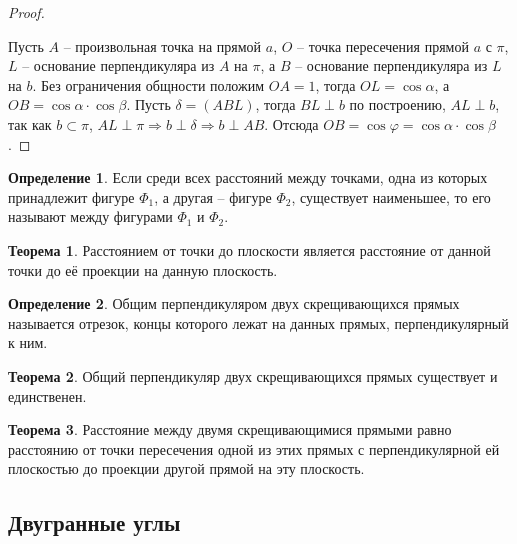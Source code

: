 \documentclass[12pt]{article}
\theoremstyle{definition}
\newtheorem{theorem}{Теорема}[section]
\newtheorem{definition}{Определение}
\begin{document}
\begin{proof}
\begin{center}
            \end{center}
            Пусть $A$ – произвольная точка на прямой $a$, $O$ – точка пересечения прямой $a$ с $\pi$, $L$ – основание перпендикуляра из $A$ на $\pi$, а $B$ – основание перпендикуляра из $L$ на $b$. Без ограничения общности положим $OA=1$, тогда $OL=\cos\alpha$, а $OB=\cos\alpha\cdot\cos\beta$. Пусть $\delta=(ABL)$, тогда $BL\perp b$ по построению, $AL\perp b$, так как $b\subset\pi$, $AL\perp\pi\Longrightarrow b\perp\delta\Longrightarrow b\perp AB$. Отсюда $OB=\cos\varphi=\cos\alpha\cdot\cos\beta$.
    \end{proof}
    \begin{definition}
        Если среди всех расстояний между точками, одна из которых принадлежит фигуре $\Phi_1$, а другая – фигуре $\Phi_2$, существует наименьшее, то его называют между фигурами $\Phi_1$ и $\Phi_2$.
    \end{definition}
    \begin{theorem}
        Расстоянием от точки до плоскости является расстояние от данной точки до её проекции на данную плоскость.
    \end{theorem}
    \begin{definition}
        Общим перпендикуляром двух скрещивающихся прямых называется отрезок, концы которого лежат на данных прямых, перпендикулярный к ним.
    \end{definition}
    \begin{theorem}
        Общий перпендикуляр двух скрещивающихся прямых существует и единственен.
    \end{theorem}
    \begin{theorem}
        Расстояние между двумя скрещивающимися прямыми равно расстоянию от точки пересечения одной из этих прямых с перпендикулярной ей плоскостью до проекции другой прямой на эту плоскость.
    \end{theorem}
    \subsection{Двугранные углы}
\end{document}
